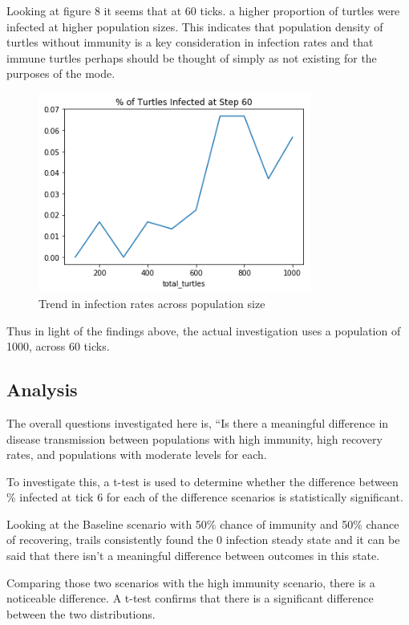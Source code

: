 \documentclass[11pt]{article} %
\begin{document}
Looking at figure 8 it seems that at 60 ticks. a higher proportion of turtles were infected at higher population sizes. This indicates that population density of turtles without immunity is a key consideration in infection rates and that immune turtles perhaps should be thought of simply as not existing for the purposes of the mode. 

\begin{figure}
\centering
\includegraphics[width=0.8\textwidth]{immunity_perc_infected_across_pop}
\caption{Trend in infection rates across population size}
\end{figure}

Thus in light of the findings above, the actual investigation uses a population of 1000, across 60 ticks. 

\subsection{Analysis}

The overall questions investigated here is, ``Is there a meaningful difference in disease transmission between populations with high immunity, high recovery rates, and populations with moderate levels for each. 

To investigate this, a t-test is used to determine whether the difference between \% infected at tick 6 for each of the difference scenarios is statistically significant. 

Looking at the Baseline scenario with 50\% chance of immunity and 50\% chance of recovering, trails consistently found the 0 infection steady state and it can be said that there isn't a meaningful difference between outcomes in this state. 

Comparing those two scenarios with the high immunity scenario, there is a noticeable difference. A t-test confirms that there is a significant difference between the two distributions. 
\end{document}
